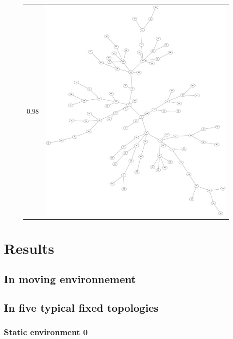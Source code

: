 \documentclass[a4paper,10pt]{article}
\begin{document}
\begin{figure}[H]
\begin{tabular}{lc}
$0.98$&\includegraphics[width=\imgSize]{images/networks/neato_Network_sparsity98.png}\\
\end{tabular}
\label{fig:netEx}

\end{figure}%
\section{Results}

\subsection{In moving environnement}

\subsection{In five typical fixed topologies}


\subsubsection{Static environment 0}
\end{document}
